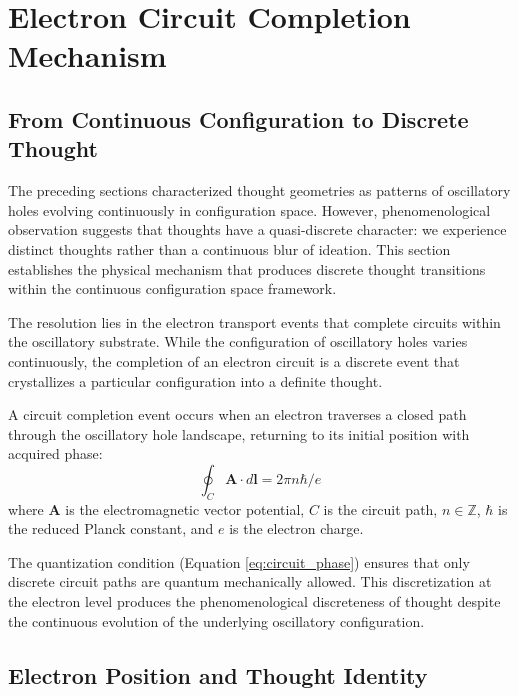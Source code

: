 \section{Electron Circuit Completion Mechanism}
\label{sec:circuit}

\subsection{From Continuous Configuration to Discrete Thought}

The preceding sections characterized thought geometries as patterns of oscillatory holes evolving continuously in configuration space. However, phenomenological observation suggests that thoughts have a quasi-discrete character: we experience distinct thoughts rather than a continuous blur of ideation. This section establishes the physical mechanism that produces discrete thought transitions within the continuous configuration space framework.

The resolution lies in the electron transport events that complete circuits within the oscillatory substrate. While the configuration of oscillatory holes varies continuously, the completion of an electron circuit is a discrete event that crystallizes a particular configuration into a definite thought.

\begin{definition}
\label{def:circuit_completion}
A circuit completion event occurs when an electron traverses a closed path through the oscillatory hole landscape, returning to its initial position with acquired phase:
\begin{equation}
\oint_C \mathbf{A} \cdot d\mathbf{l} = 2\pi n \hbar / e
\label{eq:circuit_phase}
\end{equation}
where $\mathbf{A}$ is the electromagnetic vector potential, $C$ is the circuit path, $n \in \mathbb{Z}$, $\hbar$ is the reduced Planck constant, and $e$ is the electron charge.

\end{definition}

The quantization condition (Equation \ref{eq:circuit_phase}) ensures that only discrete circuit paths are quantum mechanically allowed. This discretization at the electron level produces the phenomenological discreteness of thought despite the continuous evolution of the underlying oscillatory configuration.

\subsection{Electron Position and Thought Identity}

